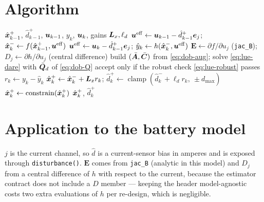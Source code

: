 \section{Algorithm}
\begin{algorithm}[H]
\caption{DOB --- one sampling period}
\begin{algorithmic}[1]
\Require $\hat{\bm{x}}^{+}_{k-1}$, $\hat{d}^+_{k-1}$, $\bm{u}_{k-1}$, $y_k$, $\bm{u}_k$, gains $\bm{L}_x,\ell_d$
\State $\bm{u}^{\mathrm{eff}} \gets \bm{u}_{k-1} - \hat{d}^+_{k-1}\bm{e}_j$; \quad $\hat{\bm{x}}^{-}_k \gets f(\hat{\bm{x}}^{+}_{k-1},\bm{u}^{\mathrm{eff}})$
\State $\bm{u}^{\mathrm{eff}} \gets \bm{u}_k - \hat{d}^+_{k-1}\bm{e}_j$; \quad $\hat{y}_k \gets h(\hat{\bm{x}}^{-}_k,\bm{u}^{\mathrm{eff}})$
  \State $\bm{E}\gets\partial f/\partial u_j$ (\texttt{jac\_B}); \quad $D_j\gets\partial h/\partial u_j$ (central difference)
  \State build $(\bar{\bm{A}},\bar{\bm{C}})$ from \eqref{eq:dob-aug}; solve \eqref{eq:lue-dare} with $\bar{\bm{Q}}_d$ of \eqref{eq:dob-Q}
  \State accept only if the robust check \eqref{eq:lue-robust} passes
\EndIf
\State $r_k \gets y_k-\hat{y}_k$
\State $\hat{\bm{x}}^{+}_k \gets \hat{\bm{x}}^{-}_k + \bm{L}_x r_k$; \quad $\hat{d}^+_k \gets \operatorname{clamp}(\hat{d}^-_k + \ell_d r_k,\ \pm d_{\max})$
\State $\hat{\bm{x}}^{+}_k \gets \operatorname{constrain}(\hat{\bm{x}}^{+}_k)$
\Ensure $\hat{\bm{x}}^{+}_k$, $\hat{d}^+_k$
\end{algorithmic}
\end{algorithm}

\section{Application to the battery model}
$j$ is the current channel, so $\hat{d}$ is a current-sensor bias in amperes and is exposed
through \texttt{disturbance()}.  $\bm{E}$ comes from \texttt{jac\_B} (analytic in this model) and
$D_j$ from a central difference of $h$ with respect to the current, because the estimator contract
does not include a $D$ member --- keeping the header model-agnostic costs two extra evaluations of
$h$ per re-design, which is negligible.


